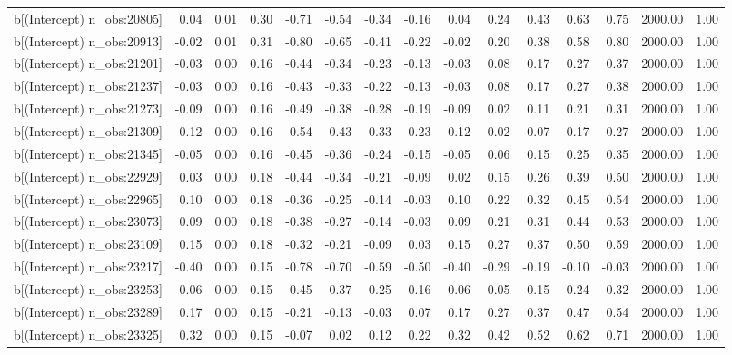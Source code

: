 \begin{table}[ht]
\begin{tabular}{rrrrrrrrrrrrrrr}
  b[(Intercept) n\_obs:20805] & 0.04 & 0.01 & 0.30 & -0.71 & -0.54 & -0.34 & -0.16 & 0.04 & 0.24 & 0.43 & 0.63 & 0.75 & 2000.00 & 1.00 \\ 
  b[(Intercept) n\_obs:20913] & -0.02 & 0.01 & 0.31 & -0.80 & -0.65 & -0.41 & -0.22 & -0.02 & 0.20 & 0.38 & 0.58 & 0.80 & 2000.00 & 1.00 \\ 
  b[(Intercept) n\_obs:21201] & -0.03 & 0.00 & 0.16 & -0.44 & -0.34 & -0.23 & -0.13 & -0.03 & 0.08 & 0.17 & 0.27 & 0.37 & 2000.00 & 1.00 \\ 
  b[(Intercept) n\_obs:21237] & -0.03 & 0.00 & 0.16 & -0.43 & -0.33 & -0.22 & -0.13 & -0.03 & 0.08 & 0.17 & 0.27 & 0.38 & 2000.00 & 1.00 \\ 
  b[(Intercept) n\_obs:21273] & -0.09 & 0.00 & 0.16 & -0.49 & -0.38 & -0.28 & -0.19 & -0.09 & 0.02 & 0.11 & 0.21 & 0.31 & 2000.00 & 1.00 \\ 
  b[(Intercept) n\_obs:21309] & -0.12 & 0.00 & 0.16 & -0.54 & -0.43 & -0.33 & -0.23 & -0.12 & -0.02 & 0.07 & 0.17 & 0.27 & 2000.00 & 1.00 \\ 
  b[(Intercept) n\_obs:21345] & -0.05 & 0.00 & 0.16 & -0.45 & -0.36 & -0.24 & -0.15 & -0.05 & 0.06 & 0.15 & 0.25 & 0.35 & 2000.00 & 1.00 \\ 
  b[(Intercept) n\_obs:22929] & 0.03 & 0.00 & 0.18 & -0.44 & -0.34 & -0.21 & -0.09 & 0.02 & 0.15 & 0.26 & 0.39 & 0.50 & 2000.00 & 1.00 \\ 
  b[(Intercept) n\_obs:22965] & 0.10 & 0.00 & 0.18 & -0.36 & -0.25 & -0.14 & -0.03 & 0.10 & 0.22 & 0.32 & 0.45 & 0.54 & 2000.00 & 1.00 \\ 
  b[(Intercept) n\_obs:23073] & 0.09 & 0.00 & 0.18 & -0.38 & -0.27 & -0.14 & -0.03 & 0.09 & 0.21 & 0.31 & 0.44 & 0.53 & 2000.00 & 1.00 \\ 
  b[(Intercept) n\_obs:23109] & 0.15 & 0.00 & 0.18 & -0.32 & -0.21 & -0.09 & 0.03 & 0.15 & 0.27 & 0.37 & 0.50 & 0.59 & 2000.00 & 1.00 \\ 
  b[(Intercept) n\_obs:23217] & -0.40 & 0.00 & 0.15 & -0.78 & -0.70 & -0.59 & -0.50 & -0.40 & -0.29 & -0.19 & -0.10 & -0.03 & 2000.00 & 1.00 \\ 
  b[(Intercept) n\_obs:23253] & -0.06 & 0.00 & 0.15 & -0.45 & -0.37 & -0.25 & -0.16 & -0.06 & 0.05 & 0.15 & 0.24 & 0.32 & 2000.00 & 1.00 \\ 
  b[(Intercept) n\_obs:23289] & 0.17 & 0.00 & 0.15 & -0.21 & -0.13 & -0.03 & 0.07 & 0.17 & 0.27 & 0.37 & 0.47 & 0.54 & 2000.00 & 1.00 \\ 
  b[(Intercept) n\_obs:23325] & 0.32 & 0.00 & 0.15 & -0.07 & 0.02 & 0.12 & 0.22 & 0.32 & 0.42 & 0.52 & 0.62 & 0.71 & 2000.00 & 1.00 \\ 

\end{tabular}
\end{table}
